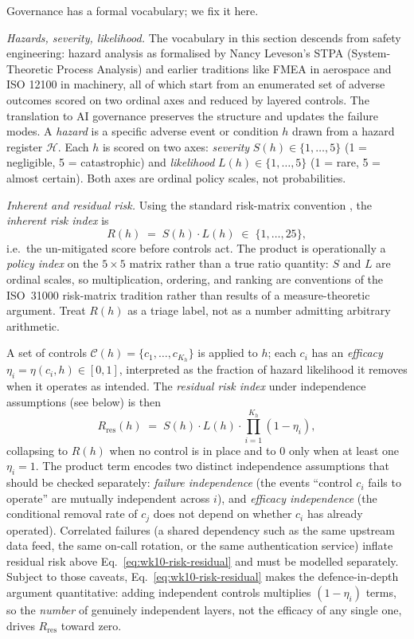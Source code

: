 \begin{notationbox}
Governance has a formal vocabulary; we fix it here.

\textit{Hazards, severity, likelihood.} The vocabulary in this
section descends from safety engineering: hazard analysis as
formalised by Nancy Leveson's STPA (System-Theoretic Process
Analysis) and earlier traditions like FMEA in aerospace and ISO
12100 in machinery, all of which start from an enumerated set of
adverse outcomes scored on two ordinal axes and reduced by layered
controls. The translation to AI governance preserves the structure
and updates the failure modes. A \emph{hazard} is a specific
adverse event or condition $h$ drawn from a hazard register
$\mathcal{H}$. Each $h$ is scored on two axes:
\emph{severity} $S(h) \in \{1, \dots, 5\}$ (1 = negligible,
5 = catastrophic) and \emph{likelihood} $L(h) \in \{1, \dots, 5\}$
(1 = rare, 5 = almost certain). Both axes are ordinal policy
scales, not probabilities.

\textit{Inherent and residual risk.} Using the standard risk-matrix
convention \citep{iso31000_2018}, the \emph{inherent risk index} is
\begin{equation}
  R(h) \;=\; S(h) \cdot L(h) \;\in\; \{1, \dots, 25\},
  \label{eq:wk10-risk}
\end{equation}
i.e.\ the un-mitigated score before controls act. The product is
operationally a \emph{policy index} on the $5 \times 5$ matrix
rather than a true ratio quantity: $S$ and $L$ are ordinal scales,
so multiplication, ordering, and ranking are conventions of the
ISO~31000 risk-matrix tradition rather than results of a
measure-theoretic argument. Treat $R(h)$ as a triage label, not as
a number admitting arbitrary arithmetic.

A set of controls $\mathcal{C}(h) = \{c_1, \dots, c_{K_h}\}$ is
applied to $h$; each $c_i$ has an \emph{efficacy}
$\eta_i = \eta(c_i, h) \in [0, 1]$, interpreted as the fraction of
hazard likelihood it removes when it operates as intended. The
\emph{residual risk index} under independence assumptions
(see below) is then
\begin{equation}
  R_\mathrm{res}(h)
  \;=\; S(h) \cdot L(h) \cdot \prod_{i=1}^{K_h} (1 - \eta_i),
  \label{eq:wk10-risk-residual}
\end{equation}
collapsing to $R(h)$ when no control is in place and to $0$ only
when at least one $\eta_i = 1$. The product term encodes two
distinct independence assumptions that should be checked separately:
\emph{failure independence} (the events ``control $c_i$ fails to
operate'' are mutually independent across $i$), and
\emph{efficacy independence} (the conditional removal rate of
$c_j$ does not depend on whether $c_i$ has already operated).
Correlated failures (a shared dependency such as the same upstream
data feed, the same on-call rotation, or the same authentication
service) inflate residual risk above
Eq.~\eqref{eq:wk10-risk-residual} and must be modelled separately.
Subject to those caveats, Eq.~\eqref{eq:wk10-risk-residual} makes
the defence-in-depth argument quantitative: adding independent
controls multiplies $(1 - \eta_i)$ terms, so the \emph{number} of
genuinely independent layers, not the efficacy of any single one,
drives $R_\mathrm{res}$ toward zero.


\end{notationbox}
